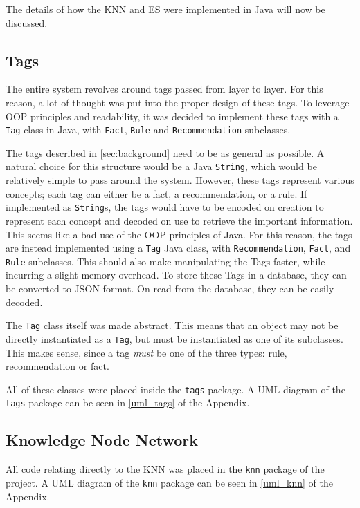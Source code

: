 \documentclass[titlepage,11pt]{article}
\newcommand{\code}[1]{\texttt{#1}}
\begin{document}
The details of how the KNN and ES were implemented in Java will now be discussed.

\subsection{Tags}

The entire system revolves around tags passed from layer to layer. For this reason, a lot of thought was put into the proper design of these tags. To leverage OOP principles and readability, it was decided to implement these tags with a \code{Tag} class in Java, with \code{Fact}, \code{Rule} and \code{Recommendation} subclasses.

The tags described in \autoref{sec:background} need to be as general as possible. A natural choice for this structure would be a Java \code{String}, which would be relatively simple to pass around the system. However, these tags represent various concepts; each tag can either be a fact, a recommendation, or a rule. If implemented as \code{String}s, the tags would have to be encoded on creation to represent each concept and decoded on use to retrieve the important information. This seems like a bad use of the OOP principles of Java. For this reason, the tags are instead implemented using a \code{Tag} Java class, with \code{Recommendation}, \code{Fact}, and \code{Rule} subclasses. This should also make manipulating the Tags faster, while incurring a slight memory overhead. To store these Tags in a database, they can be converted to JSON format. On read from the database, they can be easily decoded.

The \code{Tag} class itself was made abstract. This means that an object may not be directly instantiated as a \code{Tag}, but must be instantiated as one of its subclasses. This makes sense, since a tag \emph{must} be one of the three types: rule, recommendation or fact.

All of these classes were placed inside the \code{tags} package. A UML diagram of the \code{tags} package can be seen in \autoref{uml_tags} of the Appendix.

\subsection{Knowledge Node Network}

All code relating directly to the KNN was placed in the \code{knn} package of the project. A UML diagram of the \code{knn} package can be seen in \autoref{uml_knn} of the Appendix.
\end{document}
